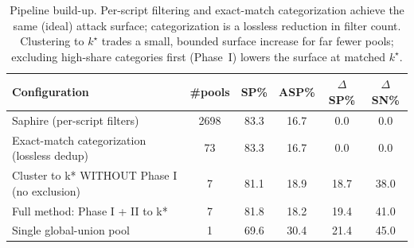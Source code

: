 \begin{table}[t]
\centering
\caption{Pipeline build-up. Per-script filtering and exact-match categorization achieve the same (ideal) attack surface; categorization is a lossless reduction in filter count. Clustering to $k^\star$ trades a small, bounded surface increase for far fewer pools; excluding high-share categories first (Phase~I) lowers the surface at matched $k^\star$.}
\label{tab:buildup}
\begin{tabular}{lccccc}
\toprule
Configuration & \#pools & SP\% & ASP\% & $\Delta$SP\% & $\Delta$SN\% \\
\midrule
Saphire (per-script filters) & 2698 & 83.3 & 16.7 & 0.0 & 0.0 \\
Exact-match categorization (lossless dedup) & 73 & 83.3 & 16.7 & 0.0 & 0.0 \\
Cluster to k* WITHOUT Phase I (no exclusion) & 7 & 81.1 & 18.9 & 18.7 & 38.0 \\
Full method: Phase I + II to k* & 7 & 81.8 & 18.2 & 19.4 & 41.0 \\
Single global-union pool & 1 & 69.6 & 30.4 & 21.4 & 45.0 \\
\bottomrule
\end{tabular}
\end{table}
